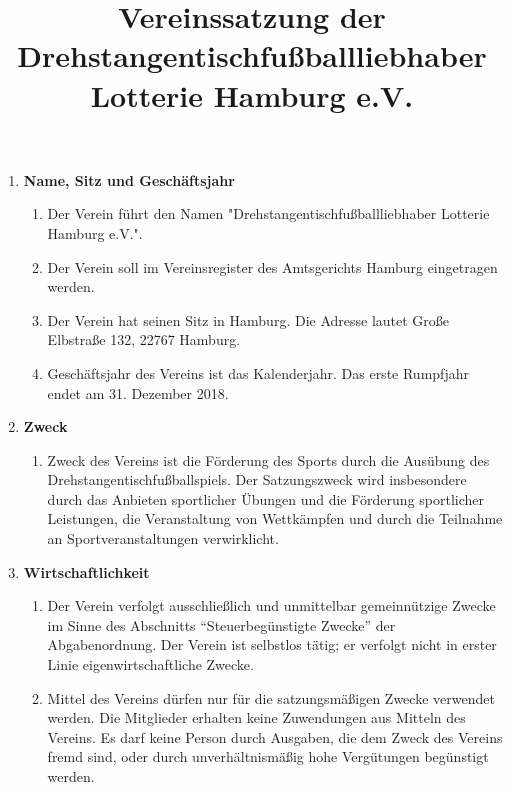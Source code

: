 \documentclass{article}
\title{\textsf{\textbf{Vereinssatzung der Drehstangentischfußballliebhaber Lotterie Hamburg e.V.}}}
\author{}
\date{}
\begin{document}
\maketitle

\begin{enumerate}[§ 1.]
\item \textsf{\textbf{Name, Sitz und Geschäftsjahr}}
\begin{enumerate}
\item Der Verein führt den Namen "Drehstangentischfußballliebhaber Lotterie Hamburg e.V.".
\item Der Verein soll im Vereinsregister des Amtsgerichts Hamburg eingetragen werden.
\item Der Verein hat seinen Sitz in Hamburg. Die Adresse lautet Große Elbstraße 132, 22767 Hamburg.
\item Geschäftsjahr des Vereins ist das Kalenderjahr. Das erste Rumpfjahr endet am 31. Dezember 2018.
\end{enumerate}

\item \textsf{\textbf{Zweck}}
\begin{enumerate}
\item[] Zweck des Vereins ist die Förderung des Sports durch die Ausübung des Drehstangentischfußballspiels. Der Satzungszweck wird insbesondere durch das Anbieten sportlicher Übungen und die Förderung sportlicher Leistungen, die Veranstaltung von Wettkämpfen und durch die Teilnahme an Sportveranstaltungen verwirklicht.
\end{enumerate}

\item \textsf{\textbf{Wirtschaftlichkeit}}
\begin{enumerate}
\item Der Verein verfolgt ausschließlich und unmittelbar gemeinnützige Zwecke im Sinne des Abschnitts "`Steuerbegünstigte Zwecke"' der Abgabenordnung. Der Verein ist selbstlos tätig; er verfolgt nicht in erster Linie eigenwirtschaftliche Zwecke.
\item Mittel des Vereins dürfen nur für die satzungsmäßigen Zwecke verwendet werden. Die Mitglieder erhalten keine Zuwendungen aus Mitteln des Vereins. Es darf keine Person durch Ausgaben, die dem Zweck des Vereins fremd sind, oder durch unverhältnismäßig hohe Vergütungen begünstigt werden.
\end{enumerate}


\end{enumerate}
\end{document}
